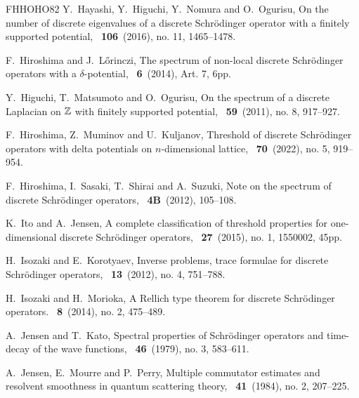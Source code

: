 \documentclass[reqno, 11pt]{amsart}
\numberwithin{equation}{section}
\begin{document}
\begin{thebibliography}{FHHOHO82}
Y.~Hayashi, Y.~Higuchi, Y.~Nomura and O.~Ogurisu,
\newblock On the number of discrete eigenvalues of a discrete {S}chr\"{o}dinger
  operator with a finitely supported potential,
~{\bf106}~(2016), no. 11, 1465--1478.

F.~Hiroshima and J.~L\H{o}rinczi,
\newblock The spectrum of non-local discrete {S}chr\"odinger operators with a
  {$\delta$}-potential,
~{\bf6}~(2014), Art. 7, 6pp.

Y.~Higuchi, T.~Matsumoto and O.~Ogurisu,
\newblock On the spectrum of a discrete {L}aplacian on {$\Bbb Z$} with finitely
  supported potential,
~{\bf59}~(2011), no. 8, 917--927.

F.~Hiroshima, Z.~Muminov and U.~Kuljanov,
\newblock Threshold of discrete {S}chr\"{o}dinger operators with delta potentials
  on {$n$}-dimensional lattice,
~{\bf70}~(2022), no. 5, 919--954.

F.~Hiroshima, I.~Sasaki, T.~Shirai and A.~Suzuki,
\newblock Note on the spectrum of discrete {S}chr\"odinger operators,
~{\bf4B}~(2012), 105--108.

K.~Ito and A.~Jensen,
\newblock A complete classification of threshold properties for one-dimensional
  discrete {S}chr\"odinger operators,
~{\bf27}~(2015), no. 1, 1550002, 45pp.

H.~Isozaki and E.~Korotyaev,
\newblock Inverse problems, trace formulae for discrete {S}chr\"odinger
  operators,
~{\bf13}~(2012), no. 4, 751--788.

H.~Isozaki and H.~Morioka,
\newblock A {R}ellich type theorem for discrete {S}chr\"odinger operators.
~{\bf8}~(2014), no. 2, 475--489.

A.~Jensen and T.~Kato,
\newblock Spectral properties of {S}chr\"{o}dinger operators and time-decay of
  the wave functions,
~{\bf46}~(1979), no. 3, 583--611.

A.~Jensen, E.~Mourre and P.~Perry,
\newblock Multiple commutator estimates and resolvent smoothness in quantum
  scattering theory,
~{\bf41}~(1984), no. 2, 207--225.


\end{thebibliography}
\end{document}
